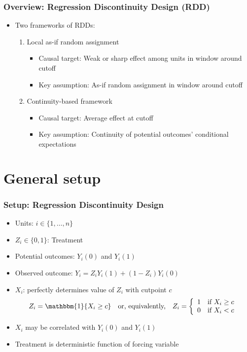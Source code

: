 \documentclass[table, xcolor = {dvipsnames}, 9pt]{beamer}
\theoremstyle{plain}
\newcommand{\bh}[1]{{\color{blue}{#1}}}
\begin{document}
\begin{frame}
\frametitle{Overview: Regression Discontinuity Design (RDD)} 
\begin{itemize} \vfill
\item Two frameworks of RDDs: \vfill
\begin{enumerate} \vfill 
\item Local as-if random assignment \\ \citep{cattaneoetal2015,saleshansen2020} \vfill
\begin{itemize} \vfill
\item Causal target: Weak or sharp effect among units in window around cutoff \vfill
\item Key assumption: As-if random assignment in window around cutoff \vfill
\end{itemize} \vfill
\item Continuity-based framework \\ \citep{hahnetal2001,imbenslemieux2008} \vfill
\begin{itemize} \vfill
\item Causal target: Average effect at cutoff \vfill
\item Key assumption: Continuity of potential outcomes' conditional expectations \vfill
\end{itemize} \vfill
\end{enumerate} \vfill
\end{itemize} \vfill
\end{frame}
\section{General setup}
\begin{frame}
\frametitle{Setup: Regression Discontinuity Design} 
\begin{itemize} \vfill
\item Units: $i \in \{1, \ldots, n\}$
\item $Z_i \in \{0,1\}$: Treatment
\item Potential outcomes: $Y_i(0)$ and $Y_i(1)$
\item Observed outcome: $Y_i = Z_i Y_i(1) + (1-Z_i) Y_i(0)$ 
\item $X_i$: \bh{Running variable} perfectly determines value of $Z_i$ with cutpoint $c$
\begin{equation*}
Z_i = \mathbbm{1}\{X_i \geq c\} \quad \text{or, equivalently,} \quad Z_i = \left\{
\begin{array}{ll}
1 & \mbox{if $X_i \geq c$}\\
0 & \mbox{if $X_i < c$}
\end{array}
\right.
\end{equation*} \vfill
\item $X_i$ may be correlated with $Y_i(0)$ and $Y_i(1)$ \vfill
\item Treatment is deterministic function of forcing variable \vfill
\end{itemize} \vfill
\end{frame}
\end{document}

